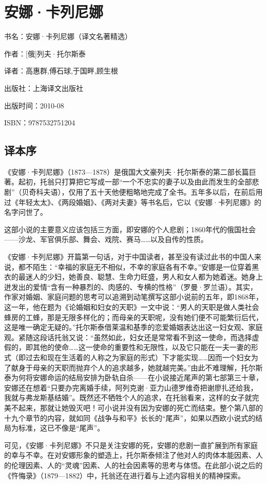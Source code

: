 
\section{安娜·卡列尼娜}


\par 书名：安娜·卡列尼娜（译文名著精选）
\par 作者：[俄]列夫·托尔斯泰
\par 译者：高惠群,傅石球,于国畔,顾生根
\par 出版社：上海译文出版社
\par 出版时间：2010-08
\par ISBN：9787532751204


\subsection*{译本序}

\par 《安娜·卡列尼娜》（1873—1878）是俄国大文豪列夫·托尔斯泰的第二部长篇巨著。起初，托翁只打算把它写成一部“一个不忠实的妻子以及由此而发生的全部悲剧”（贝奇科夫语），仅用了五十天他便粗略地完成了全书。五年多以后，在前后用过《年轻太太》、《两段婚姻》、《两对夫妻》等书名后，它以《安娜·卡列尼娜》的名字问世了。
\par 这部小说的主要意义应该包括三方面，即安娜的个人悲剧；1860年代的俄国社会——沙龙、军官俱乐部、舞会、戏院、赛马……以及自传的性质。
\par 《安娜·卡列尼娜》开篇第一句话，对于中国读者，甚至没有读过此书的中国人来说，都不陌生：“幸福的家庭无不相似，不幸的家庭各有不幸。”安娜是一位穿着黑衣的最迷人的少妇，她善良、聪慧、生命力旺盛，男人和女人都为她着迷。她身上迸发出的爱情“含有一种暴烈的、肉感的、专横的性格”（罗曼·罗兰语）。其实，作家对婚姻、家庭问题的思考可以追溯到动笔撰写这部小说前的五年，即1868年，这一年，他在题为《论婚姻和妇女的天职》一文中说：“男人的天职是做人类社会蜂房的工蜂，那是无限多样化的；而母亲的天职呢，没有她们便不可能繁衍后代，这是唯一确定无疑的。”托尔斯泰借莱温和基季的恋爱婚姻表达出这一妇女观、家庭观。紧随这段话托翁又说：“虽然如此，妇女还是常常看不到这一使命，而选择虚假的，即其他的使命……这一使命的重要性和无限性，以及它只能在一夫一妻的形式（即过去和现在生活着的人称之为家庭的形式）下才能实现……因而一个妇女为了献身于母亲的天职而抛弃个人的追求越多，她就越完美。”由此不难理解，托尔斯泰为何将安娜命运的结局安排为卧轨自杀——在小说接近尾声的第七部第三十章，安娜还在想着“只要办完离婚手续，阿列克谢·亚力山德罗维奇把谢廖扎还给我，我就与弗龙斯基结婚”。既然还不牺牲个人的追求，在托翁看来，这样的女子就完美不起来，那就让她毁灭吧！可小说并没有因为安娜的死亡而结束。整个第八部的十九个章节的内容，就如同《战争与和平》长长的“尾声”，如果以西欧小说式的结局为标准，这已不像是“尾声”。
\par 可见，《安娜·卡列尼娜》不只是关注安娜的死，安娜的悲剧一直扩展到所有家庭的幸与不幸。在对安娜形象的塑造上，托尔斯泰倾注了他对人的肉体本能因素、人的伦理因素、人的“灵魂”因素、人的社会因素等的思考与体悟。在此部小说之后的《忤悔录》（1879—1882）中，托翁还在进行着与上述内容相关的精神探索。
\par {}
\par {}


